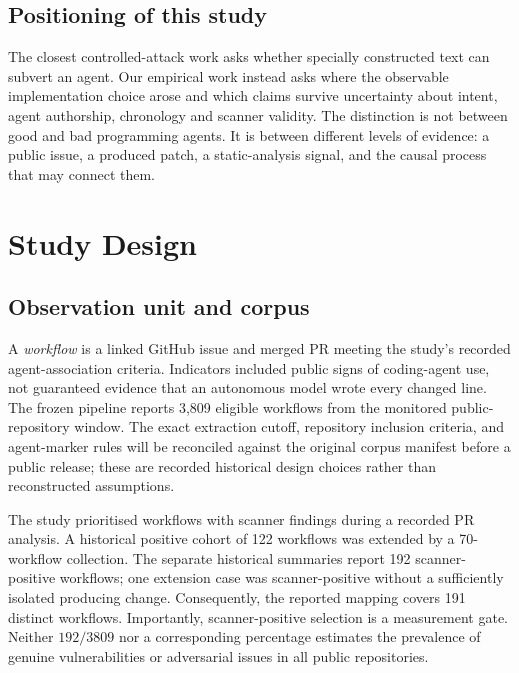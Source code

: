 \documentclass[journal,10pt,twoside]{IEEEtran}
\begin{document}
\subsection{Positioning of this study}
The closest controlled-attack work asks whether specially constructed text can subvert an agent. Our empirical work instead asks where the observable implementation choice arose and which claims survive uncertainty about intent, agent authorship, chronology and scanner validity. The distinction is not between good and bad programming agents. It is between different levels of evidence: a public issue, a produced patch, a static-analysis signal, and the causal process that may connect them.

\section{Study Design}
\subsection{Observation unit and corpus}
A \emph{workflow} is a linked GitHub issue and merged PR meeting the study's recorded agent-association criteria. Indicators included public signs of coding-agent use, not guaranteed evidence that an autonomous model wrote every changed line. The frozen pipeline reports 3,809 eligible workflows from the monitored public-repository window. The exact extraction cutoff, repository inclusion criteria, and agent-marker rules will be reconciled against the original corpus manifest before a public release; these are recorded historical design choices rather than reconstructed assumptions.

The study prioritised workflows with scanner findings during a recorded PR analysis. A historical positive cohort of 122 workflows was extended by a 70-workflow collection. The separate historical summaries report 192 scanner-positive workflows; one extension case was scanner-positive without a sufficiently isolated producing change. Consequently, the reported mapping covers 191 distinct workflows. Importantly, scanner-positive selection is a measurement gate. Neither $192/3809$ nor a corresponding percentage estimates the prevalence of genuine vulnerabilities or adversarial issues in all public repositories.
\end{document}
